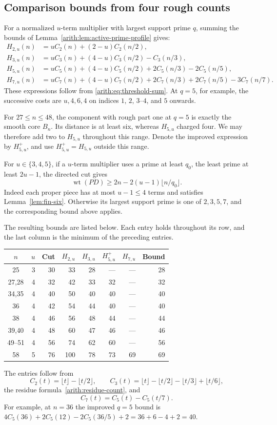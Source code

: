 \documentclass[11pt]{article}
\DeclareMathOperator{\wt}{wt}\DeclareMathOperator{\ord}{ord}
\numberwithin{equation}{section}
\theoremstyle{definition}\newtheorem{definition}[theorem]{Definition}
\theoremstyle{remark}\newtheorem{remark}[theorem]{Remark}
\begin{document}
\subsection{Comparison bounds from four rough counts}

For a normalized $u$-term multiplier with largest support prime $q$,
summing the bounds of Lemma~\ref{arith:lem:active-prime-profile} gives:
\begin{align*}
 H_{2,u}(n)&=uC_2(n)+(2-u)C_2(n/2),\\
 H_{3,u}(n)&=uC_3(n)+(4-u)C_3(n/2)-C_3(n/3),\\
 H_{5,u}(n)&=uC_5(n)+(4-u)C_5(n/2)
                  +2C_5(n/3)-2C_5(n/5),\\
 H_{7,u}(n)&=uC_7(n)+(4-u)C_7(n/2)
                  +2C_7(n/3)+2C_7(n/5)-3C_7(n/7).
\end{align*}
These expressions follow from \eqref{arith:eq:threshold-sum}.
At $q=5$, for example,
the successive
costs are $u,4,6,4$ on indices $1$, $2$, $3$--$4$, and $5$ onwards.

For $27\le n\le48$, the component with rough part one at $q=5$
is exactly the smooth core $B_n$.  Its distance is at least six,
whereas $H_{5,u}$ charged four.  We may therefore add two to
$H_{5,u}$ throughout this range.  Denote the improved expression by
$H^+_{5,u}$, and use $H^+_{5,u}=H_{5,u}$ outside this range.

For $u\in\{3,4,5\}$, if a $u$-term multiplier uses a prime at least
$q_0$, the least prime at least $2u-1$, the directed cut gives
\begin{equation}\label{eq:fin-quantitative-cut}
 \wt(PD)\ge 2n-2(u-1)\lfloor n/q_0\rfloor.
\end{equation}
Indeed each proper piece has at most $u-1\le4$ terms and satisfies
Lemma~\ref{lem:fin-six}.  Otherwise its largest support prime is
one of $2,3,5,7$, and the corresponding bound above applies.

The resulting bounds are listed below. Each entry holds throughout its
row, and the last column is the minimum of the preceding entries.
\begin{center}\small
\begin{tabular}{c|r|r|r|r|r|r|r}
$n$&$u$&Cut&$H_{2,u}$&$H_{3,u}$&$H^+_{5,u}$&$H_{7,u}$&Bound\\\hline
25&3&30&33&28&---&---&28\\
27,28&4&32&42&33&32&---&32\\
34,35&4&40&50&40&40&---&40\\
36&4&42&54&44&40&---&40\\
38&4&46&56&48&44&---&44\\
39,40&4&48&60&47&46&---&46\\
49--51&4&56&74&62&60&---&56\\
58&5&76&100&78&73&69&69
\end{tabular}
\end{center}
The entries follow from
\[
 C_2(t)=\lfloor t\rfloor-\lfloor t/2\rfloor,
 \qquad C_3(t)=\lfloor t\rfloor-\lfloor t/2\rfloor
                    -\lfloor t/3\rfloor+\lfloor t/6\rfloor,
\]
the residue formula~\eqref{arith:residue-count}, and
\[
 C_7(t)=C_5(t)-C_5(t/7).
\]
For example, at $n=36$ the improved $q=5$ bound is
$4C_5(36)+2C_5(12)-2C_5(36/5)+2=36+6-4+2=40$.
\end{document}
